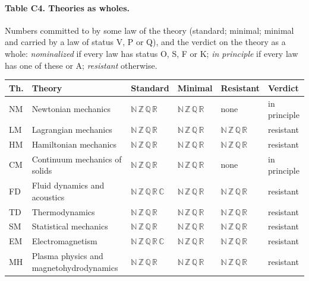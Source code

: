 \paragraph{Table C4. Theories as wholes.} Numbers committed to by some law of the theory (standard; minimal; minimal and carried by a law of status V, P or Q), and the verdict on the theory as a whole: \emph{nominalized} if every law has status O, S, F or K; \emph{in principle} if every law has one of these or A; \emph{resistant} otherwise.
{\footnotesize\setlength{\tabcolsep}{3pt}
\begin{center}
\begin{tabular}{l p{5.2cm} l l l l}
\toprule
Th. & Theory & Standard & Minimal & Resistant & Verdict \\
\midrule
NM & Newtonian mechanics & $\mathbb N\,\mathbb Z\,\mathbb Q\,\mathbb R$ & $\mathbb N\,\mathbb Z\,\mathbb Q\,\mathbb R$ & none & in principle \\
LM & Lagrangian mechanics & $\mathbb N\,\mathbb Z\,\mathbb Q\,\mathbb R$ & $\mathbb N\,\mathbb Z\,\mathbb Q\,\mathbb R$ & $\mathbb N\,\mathbb Z\,\mathbb Q\,\mathbb R$ & resistant \\
HM & Hamiltonian mechanics & $\mathbb N\,\mathbb Z\,\mathbb Q\,\mathbb R$ & $\mathbb N\,\mathbb Z\,\mathbb Q\,\mathbb R$ & $\mathbb N\,\mathbb Z\,\mathbb Q\,\mathbb R$ & resistant \\
CM & Continuum mechanics of solids & $\mathbb N\,\mathbb Z\,\mathbb Q\,\mathbb R$ & $\mathbb N\,\mathbb Z\,\mathbb Q\,\mathbb R$ & none & in principle \\
FD & Fluid dynamics and acoustics & $\mathbb N\,\mathbb Z\,\mathbb Q\,\mathbb R\,\mathbb C$ & $\mathbb N\,\mathbb Z\,\mathbb Q\,\mathbb R$ & $\mathbb N\,\mathbb Z\,\mathbb Q\,\mathbb R$ & resistant \\
TD & Thermodynamics & $\mathbb N\,\mathbb Z\,\mathbb Q\,\mathbb R$ & $\mathbb N\,\mathbb Z\,\mathbb Q\,\mathbb R$ & $\mathbb N\,\mathbb Z\,\mathbb Q\,\mathbb R$ & resistant \\
SM & Statistical mechanics & $\mathbb N\,\mathbb Z\,\mathbb Q\,\mathbb R$ & $\mathbb N\,\mathbb Z\,\mathbb Q\,\mathbb R$ & $\mathbb N\,\mathbb Z\,\mathbb Q\,\mathbb R$ & resistant \\
EM & Electromagnetism & $\mathbb N\,\mathbb Z\,\mathbb Q\,\mathbb R\,\mathbb C$ & $\mathbb N\,\mathbb Z\,\mathbb Q\,\mathbb R$ & $\mathbb N\,\mathbb Z\,\mathbb Q\,\mathbb R$ & resistant \\
MH & Plasma physics and magnetohydrodynamics & $\mathbb N\,\mathbb Z\,\mathbb Q\,\mathbb R$ & $\mathbb N\,\mathbb Z\,\mathbb Q\,\mathbb R$ & $\mathbb N\,\mathbb Z\,\mathbb Q\,\mathbb R$ & resistant \\

\end{tabular}
\end{center}}
